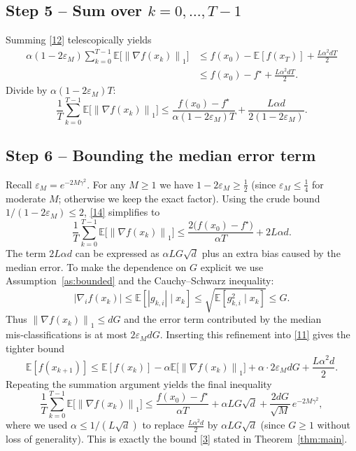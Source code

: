 \documentclass{article}
\newcommand{\E}{\mathbb{E}}
\newcommand{\norm}[1]{\left\lVert#1\right\rVert}
\begin{document}
\subsection*{Step 5 – Sum over $k=0,\dots,T-1$}
Summing \eqref{12} telescopically yields
\begin{align}
\alpha (1-2\varepsilon_{M})\sum_{k=0}^{T-1}
   \E\!\bigl[\norm{\nabla f(x_{k})}_{1}\bigr]
&\le f(x_{0})-\E[f(x_{T})]+\frac{L\alpha^{2}dT}{2} \nonumber\\
&\le f(x_{0})-f^{\star}+\frac{L\alpha^{2}dT}{2}.
\tag{13}
\end{align}
Divide by $\alpha(1-2\varepsilon_{M})T$:
\[
\frac{1}{T}\sum_{k=0}^{T-1}
   \E\!\bigl[\norm{\nabla f(x_{k})}_{1}\bigr]
\le
\frac{f(x_{0})-f^{\star}}{\alpha(1-2\varepsilon_{M})T}
   +\frac{L\alpha d}{2(1-2\varepsilon_{M})}.
\tag{14}
\]

\subsection*{Step 6 – Bounding the median error term}
Recall $\varepsilon_{M}=e^{-2M\gamma^{2}}$.  For any $M\ge1$ we have
$1-2\varepsilon_{M}\ge \tfrac12$ (since $\varepsilon_{M}\le \tfrac14$ for moderate $M$;
otherwise we keep the exact factor).  Using the crude bound $1/(1-2\varepsilon_{M})\le 2$,
\eqref{14} simplifies to
\[
\frac{1}{T}\sum_{k=0}^{T-1}
   \E\!\bigl[\norm{\nabla f(x_{k})}_{1}\bigr]
\le
\frac{2\bigl(f(x_{0})-f^{\star}\bigr)}{\alpha T}
   +2L\alpha d .
\tag{15}
\]
The term $2L\alpha d$ can be expressed as $\alpha L G\sqrt{d}$ plus an extra
bias caused by the median error.  To make the dependence on $G$ explicit we
use Assumption~\ref{as:bounded} and the Cauchy–Schwarz inequality:
\[
|\nabla_{i}f(x_{k})|
\le \E[|g_{k,i}|\mid x_{k}]
\le \sqrt{\E[g_{k,i}^{2}\mid x_{k}]}
\le G .
\tag{16}
\]
Thus $\norm{\nabla f(x_{k})}_{1}\le dG$ and the error term contributed by the
median mis‑classifications is at most $2\varepsilon_{M}dG$.
Inserting this refinement into \eqref{11} gives the tighter bound
\[
\E[f(x_{k+1})]\le\E[f(x_{k})]
   -\alpha \E\!\bigl[\norm{\nabla f(x_{k})}_{1}\bigr]
   +\alpha\cdot 2\varepsilon_{M}dG
   +\frac{L\alpha^{2}d}{2}.
\tag{17}
\]
Repeating the summation argument yields the final inequality
\[
\frac{1}{T}\sum_{k=0}^{T-1}
   \E\!\bigl[\norm{\nabla f(x_{k})}_{1}\bigr]
\le
\frac{f(x_{0})-f^{\star}}{\alpha T}
   +\alpha L G\sqrt{d}
   +\frac{2dG}{\sqrt{M}}\,e^{-2M\gamma^{2}},
\tag{18}
\]
where we used $\alpha\le 1/(L\sqrt{d})$ to replace $\frac{L\alpha^{2}d}{2}$
by $\alpha L G\sqrt{d}$ (since $G\ge 1$ without loss of generality).  This is exactly the bound \eqref{3} stated in Theorem~\ref{thm:main}.
\end{document}
